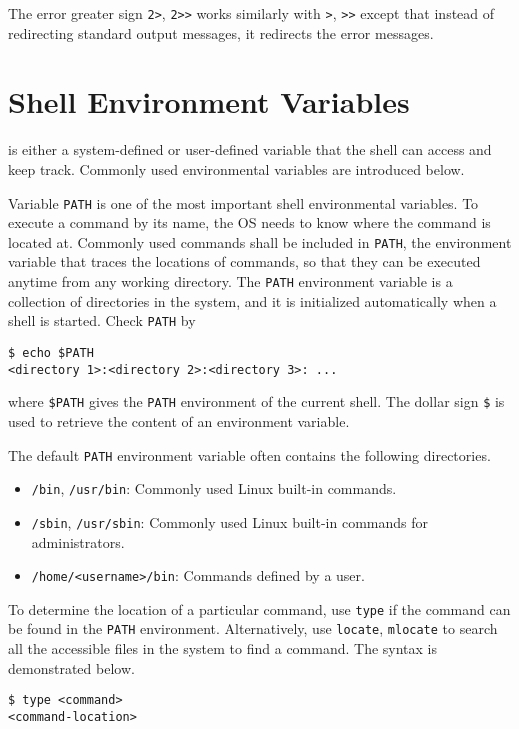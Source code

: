 The error greater sign \verb|2>|, \verb|2>>| works similarly with \verb|>|, \verb|>>| except that instead of redirecting standard output messages, it redirects the error messages.

\section{Shell Environment Variables}\label{ch:sb:subsec:shellenvvar}

 is either a system-defined or user-defined variable that the shell can access and keep track. Commonly used environmental variables are introduced below.

Variable \verb|PATH| is one of the most important shell environmental variables. To execute a command by its name, the OS needs to know where the command is located at. Commonly used commands shall be included in \verb|PATH|, the environment variable that traces the locations of commands, so that they can be executed anytime from any working directory. The \verb|PATH| environment variable is a collection of directories in the system, and it is initialized automatically when a shell is started. Check \verb|PATH| by
\begin{lstlisting}
$ echo $PATH
<directory 1>:<directory 2>:<directory 3>: ...
\end{lstlisting}
where \verb|$PATH| gives the \verb|PATH| environment of the current shell. The dollar sign \verb|$| is used to retrieve the content of an environment variable. 

The default \verb|PATH| environment variable often contains the following directories. 
\begin{itemize}
\item \verb|/bin|, \verb|/usr/bin|: Commonly used Linux built-in commands.
\item \verb|/sbin|, \verb|/usr/sbin|: Commonly used Linux built-in commands for administrators.
\item \verb|/home/<username>/bin|: Commands defined by a user.
\end{itemize}
To determine the location of a particular command, use \verb|type| if the command can be found in the \verb|PATH| environment. Alternatively, use \verb|locate|, \verb|mlocate| to search all the accessible files in the system to find a command. The syntax is demonstrated below.
\begin{lstlisting}
$ type <command>
<command-location>
\end{lstlisting}

